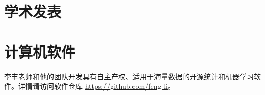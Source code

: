 \documentclass[twoside,a4paper,11pt]{article}
\begin{document}
\begin{refsection}
\section{学术发表}
\nocite{PanZ2025MyopiaHigh}
\nocite{ZhongY2025OptimalStarting}
\nocite{WangWen2025VARX}
\nocite{GaoY2024GridPoint}
\nocite{WangH2024CatastropheDuration}
\nocite{HuangY2024LocalInformation}
\nocite{RenY2023InfiniteForecast}
\nocite{ZhangG2023ProbabilisticForecast}
\nocite{LiF2024ForecasterReview}
\nocite{LiL2023ForecastingLarge}
\nocite{ZhangB2023OptimalReconciliation}
\nocite{LiL2023FeaturebasedIntermittent}
\nocite{WangX2023ForecastCombinations}
\nocite{PanR2022NoteDistributed}
\nocite{LiL2023BayesianForecast}
\nocite{WangZ2022EscalatorAccident}
\nocite{WangX2023DistributedARIMA}
\nocite{AndererM2022HierarchicalForecasting}
\nocite{JanewayMG2021ClinicalDiagnostic}
\nocite{PetropoulosF2022ForecastingTheory}
\nocite{KangY2022ForecastForecasts}
\nocite{TalagalaTS2022FFORMPPFeaturebased}
\nocite{ZhuX2021LeastSquareApproximation}
\nocite{WangX2022UncertaintyEstimation}
\nocite{KangY2021DejaVu}
\nocite{HaoC2020BilinearReduced}
\nocite{LiX2020ForecastingTime}
\nocite{KangY2020GRATISGeneRAting}
\nocite{kang2020statcompcn}
\nocite{kang2020fppcn}
\nocite{KalesanB2020IntersectionsFirearm}
\nocite{BaileyHM2019ChangesPatterns}
\nocite{LiF2019CreditRisk}
\nocite{LiF2018ImprovingForecasting}
\nocite{PinoEC2018CohortProfile}
\nocite{li2016distributedcn}
\nocite{LiF2013BayesianModeling}
\nocite{LiF2013EfficientBayesian}
\nocite{LiF2011ModellingConditional}
\nocite{LiF2010FlexibleModeling}

\printbibliography[heading=none]

\newpage
\section{计算机软件}
李丰老师和他的团队开发具有自主产权、适用于海量数据的开源统计和机器学习软件。详情请访问软件仓库 \url{https://github.com/feng-li}。


\end{refsection}
\end{document}
